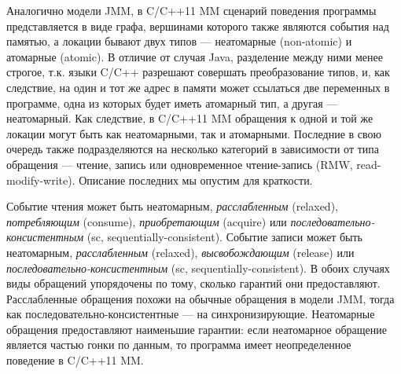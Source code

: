 Аналогично модели JMM, в C/C++11 MM сценарий поведения программы представляется в виде графа,
вершинами которого также являются события над памятью,
а локации бывают двух типов --- неатомарные (non-atomic) и атомарные (atomic).
В отличие от случая Java, разделение между ними менее строгое,
т.к. языки C/C++ разрешают совершать преобразование типов, и, как следствие,
на один и тот же адрес в памяти может ссылаться две переменных в программе, одна из которых будет
иметь атомарный тип, а другая --- неатомарный.
Как следствие, в C/C++11 MM обращения к одной и той же локации могут быть как неатомарными, так и атомарными.
Последние в свою очередь также подразделяются на несколько категорий в зависимости от типа обращения ---
чтение, запись или одновременное чтение-запись (RMW, read-modify-write).
Описание последних мы опустим для краткости.

Событие чтения может быть неатомарным, \emph{расслабленным} (relaxed),
\emph{потребляющим} (consume), \emph{приобретающим} (acquire)
или \emph{последовательно-консистентным} (sc, sequentially-consistent).
Событие записи может быть неатомарным, \emph{расслабленным} (relaxed),
\emph{высвобождающим} (release)
или \emph{последовательно-консистентным} (sc, sequentially-consistent).
В обоих случаях виды обращений упорядочены по тому, сколько гарантий они предоставляют.
Расслабленные обращения похожи на обычные обращения в модели JMM, тогда как
последовательно-консистентные --- на синхронизирующие.
Неатомарные обращения предоставляют наименьшие гарантии: если неатомарное обращение
является частью гонки по данным, то программа имеет неопределенное поведение в C/C++11 MM.




